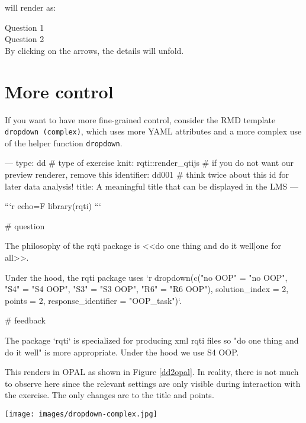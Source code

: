 \documentclass[twoside]{tufte-book}
\newenvironment{Shaded}{}{}
\begin{document}
will render as:

\noindent\textrightarrow{} Question 1\\
\noindent\textrightarrow{} Question 2\\

By clicking on the arrows, the details will unfold.

\section{More control}\label{more-control-3}

If you want to have more fine-grained control, consider the RMD template \texttt{dropdown\ (complex)}, which uses more YAML attributes and a more complex use of the helper function \texttt{dropdown}.

\begin{Shaded}
\begin{Highlighting}
---
type: dd # type of exercise
knit: rqti::render_qtijs # if you do not want our preview renderer, remove this
identifier: dd001 # think twice about this id for later data analysis!
title: A meaningful title that can be displayed in the LMS
---

```{r echo=F}
library(rqti)
```

# question

The philosophy of the rqti package is <<do one thing and do it well|one for
all>>.

Under the hood, the rqti package uses `r dropdown(c("no OOP" = "no OOP", "S4" =
"S4 OOP", "S3" = "S3 OOP", "R6" = "R6 OOP"), solution_index = 2, points = 2,
response_identifier = "OOP_task")`.

# feedback

The package `rqti` is specialized for producing xml rqti files so "do one thing
and do it well" is more appropriate. Under the hood we use S4 OOP.
\end{Highlighting}
\end{Shaded}

This renders in OPAL as shown in Figure \ref{dd2opal}. In reality, there is not much to observe here since the relevant settings are only visible during interaction with the exercise. The only changes are to the title and points.

\begin{figure*}
\centering
\texttt{[image: images/dropdown-complex.jpg]}
\caption{\label{dd2opal}More complex dropdown task rendered in OPAL}
\end{figure*}
\end{document}
